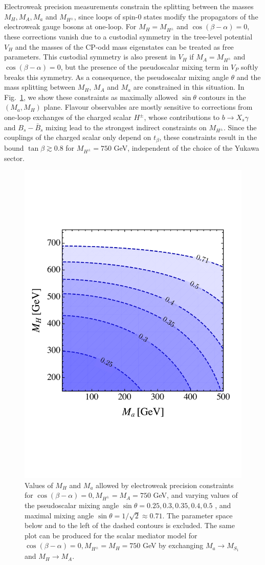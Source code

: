 Electroweak precision measurements constrain the splitting between the masses $M_H, M_A, M_a$ and $M_{H^\pm}$, since loops of spin-0 states modify the propagators of the electroweak gauge bosons at one-loop. For $M_H=M_{H^\pm}$ and $\cos(\beta-\alpha)=0$, these corrections vanish due to a custodial symmetry in the tree-level potential $V_H$ \cite{} and the masses of the CP-odd mass eigenstates can be treated as free parameters. This custodial symmetry is also present in $V_H$ if $M_A=M_{H^\pm}$ and $\cos(\beta-\alpha)=0$, but the presence of the pseudoscalar mixing term in $V_P$ softly breaks this symmetry. As a consequence, the pseudoscalar mixing angle $\theta$ and the mass splitting between $M_H$, $M_A$ and $M_a$ are constrained in this situation. In Fig.~\ref{fig:EWPM}, we show these constraints as maximally allowed $\sin \theta$ contours in the $(M_a, M_H)$ plane.
Flavour observables are mostly sensitive to corrections from one-loop exchanges of the charged scalar ${H^\pm}$, whose contributions to $b \to X_s \gamma$ \cite{Hermann:2012fc,Misiak:2015xwa,Czakon:2015exa} and $B_s-\bar B_s$ mixing \cite{Abbott:1979dt,Geng:1988bq,Buras:1989ui,Eberhardt:2013uba} lead to the strongest indirect constraints on $M_{H^\pm}$. Since the couplings of the charged scalar only depend on $t_\beta$, these constraints result in the bound $\tan \beta \gtrsim 0.8$ for $M_{H^\pm}=750$ GeV, independent of the choice of the Yukawa sector.\\
\begin{figure}[t]
\centering
\includegraphics[width=.5\textwidth]{texinputs/03_theoparameters/Figs/EWPM}
\caption{\label{fig:EWPM}Values of $M_H$ and $M_a$ allowed by electroweak precision constraints for $\cos(\beta-\alpha)=0, M_{H^\pm}=M_A=750$ GeV, and varying values of the pseudoscalar mixing angle $\sin \theta =0.25, 0.3, 0.35, 0.4, 0.5$ , and maximal mixing angle $\sin\theta =1/\sqrt{2}\approx 0.71$. The parameter space below and to the left of the dashed contours is excluded. The same plot can be produced for the scalar mediator model for $\cos(\beta-\alpha)=0, M_{H^\pm}=M_H=750$ GeV by exchanging $M_a\rightarrow M_{S_1}$ and $M_H\rightarrow M_{A}$. }
\end{figure}

